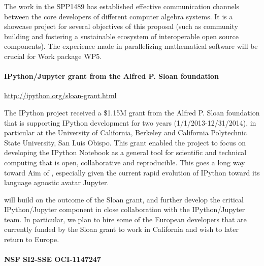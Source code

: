 The work in the SPP1489 has established effective communication channels between 
the core developers of different computer algebra systems. It is a showcase project
for several objectives of this proposal (such as community building and
fostering a sustainable ecosystem of interoperable open source components). 
The experience made in parallelizing mathematical software will be crucial for
Work package WP5.


\paragraph{IPython/Jupyter grant from the Alfred P. Sloan foundation}
\url{http://ipython.org/sloan-grant.html}


The IPython project received a \$1.15M grant from the Alfred P. Sloan%
foundation that is supporting IPython development for two years
(1/1/2013-12/31/2014), in particular at the University of California,
Berkeley and California Polytechnic State University, San Luis Obispo.
This grant enabled the project to focus on developing the IPython
Notebook as a general tool for scientific and technical computing that
is open, collaborative and reproducible. This goes a long way toward
Aim  of \TheProject, especially given the current
rapid evolution of IPython toward its language agnostic avatar
Jupyter.

\TheProject will build on the outcome of the Sloan grant, and further
develop the critical IPython/Jupyter component in close collaboration
with the IPython/Jupyter team. In particular, we plan to hire some of
the European developers that are currently funded by the Sloan grant
to work in California and wish to later return to Europe.

\paragraph{NSF SI2-SSE OCI-1147247}


